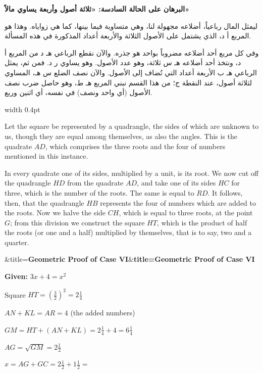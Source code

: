 \documentclass[11pt,a4paper]{book}
\newenvironment{mathbox}[1][]{%
  \smallskip\par\noindent
  \begin{lrbox}{\mathboxsave}
  \begin{minipage}{\dimexpr\linewidth-2\fboxsep-2\fboxrule\relax}%
  \setlength{\parskip}{0.3em}%
  \ifx&#1&\else\textbf{#1}\\[0.2cm]\fi
}{%
  \end{minipage}%
  \end{lrbox}
  \fcolorbox{sectioncolor}{mathbg}{\usebox{\mathboxsave}}%
  \smallskip}
\begin{document}
\noindent\begin{minipage}[t]{0.48\textwidth}
\raggedleft

\begin{Arabic}
\textbf{البرهان على الحالة السادسة: «ثلاثة أصول وأربعة يساوي مالاً»}

ليمثل المال رباعياً، أضلاعه مجهولة لنا، وهي متساوية فيما بينها، كما هي زواياه. وهذا هو المربع أ د، الذي يشتمل على الأصول الثلاثة والأربعة أعداد المذكورة في هذه المسألة.

وفي كل مربع أحد أضلاعه مضروباً بواحد هو جذره. والآن نقطع الرباعي هـ د من المربع أ د، ونتخذ أحد أضلاعه هـ س ثلاثة، وهو عدد الأصول. وهو يساوي ر د. فمن ثم، يمثل الرباعي هـ ب الأربعة أعداد التي تُضاف إلى الأصول. والآن نصف الضلع س هـ، المساوي لثلاثة أصول، عند النقطة ج؛ من هذا القسم نبني المربع هـ ط، وهو حاصل ضرب نصف الأصول (أي واحد ونصف) في نفسه، أي اثنين وربع.
\end{Arabic}

\end{minipage}%
\hfill\vrule width 0.4pt\hfill
\begin{minipage}[t]{0.48\textwidth}
\raggedright

Let the square be represented by a quadrangle, the sides of which are unknown to us, though they are equal among themselves, as also the angles. This is the quadrate $AD$, which comprises the three roots and the four of numbers mentioned in this instance.

In every quadrate one of its sides, multiplied by a unit, is its root. We now cut off the quadrangle $HD$ from the quadrate $AD$, and take one of its sides $HC$ for three, which is the number of the roots. The same is equal to $RD$. It follows, then, that the quadrangle $HB$ represents the four of numbers which are added to the roots. Now we halve the side $CH$, which is equal to three roots, at the point $G$; from this division we construct the square $HT$, which is the product of half the roots (or one and a half) multiplied by themselves, that is to say, two and a quarter.

\end{minipage}
\vspace{0.3cm}

\begin{mathbox}[title={\textbf{Geometric Proof of Case VI}}]
\begin{center}
\textbf{Given:} $3x + 4 = x^2$

\vspace{0.2cm}

Square $HT = \left(\frac{3}{2}\right)^2 = 2\tfrac{1}{4}$

$AN + KL = AR = 4$ (the added numbers)

$GM = HT + (AN + KL) = 2\tfrac{1}{4} + 4 = 6\tfrac{1}{4}$

$AG = \sqrt{GM} = 2\tfrac{1}{2}$

$x = AG + GC = 2\tfrac{1}{2} + 1\tfrac{1}{2} =$ 
\end{center}
\end{mathbox}
\end{document}
